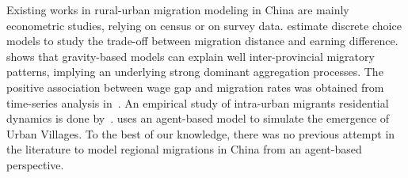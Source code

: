




Existing works in rural-urban migration modeling in China are mainly econometric studies, relying on census or on survey data. \cite{zhang2013measuring} estimate discrete choice models to study the trade-off between migration distance and earning difference. \cite{fan2005modeling} shows that gravity-based models can explain well inter-provincial migratory patterns, implying an underlying strong dominant aggregation processes. The positive association between wage gap and migration rates was obtained from time-series analysis in~\cite{zhang2003rural}. An empirical study of intra-urban migrants residential dynamics is done by~\cite{wu2006migrant}. \cite{xie2007simulating} uses an agent-based model to simulate the emergence of Urban Villages.
To the best of our knowledge, there was no previous attempt in the literature to model regional migrations in China from an agent-based perspective.




